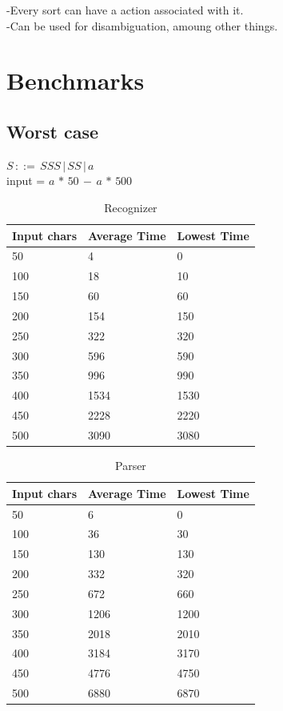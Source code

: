 \documentclass[a4paper,10pt]{article}
\begin{document}
-Every sort can have a action associated with it.\\
-Can be used for disambiguation, amoung other things.

\section{Benchmarks}

\subsection{Worst case}

$S\,::=\,SSS\,|\,SS\,|\,a$\\
input = $a\,*\,50\,-\,a\,*\,500$

\begin{table}[H]
\centering
\begin{tabular}{ | p{5em} | p{7em} | p{6em} | }
  \hline
  Input chars & Average Time & Lowest Time \\
  \hline
  50 & 4 & 0 \\
  100 & 18 & 10 \\
  150 & 60 & 60 \\
  200 & 154 & 150 \\
  250 & 322 & 320 \\
  300 & 596 & 590 \\
  350 & 996 & 990 \\
  400 & 1534 & 1530 \\
  450 & 2228 & 2220 \\
  500 & 3090 & 3080 \\
  \hline
\end{tabular}
\caption{Recognizer}
\end{table}

\begin{table}[H]
\centering
\begin{tabular}{ | p{5em} | p{7em} | p{6em} | }
  \hline
  Input chars & Average Time & Lowest Time \\
  \hline
  50 & 6 & 0 \\
  100 & 36 & 30 \\
  150 & 130 & 130 \\
  200 & 332 & 320 \\
  250 & 672 & 660 \\
  300 & 1206 & 1200 \\
  350 & 2018 & 2010 \\
  400 & 3184 & 3170 \\
  450 & 4776 & 4750 \\
  500 & 6880 & 6870 \\
  \hline
\end{tabular}
\caption{Parser}
\end{table}
\end{document}
